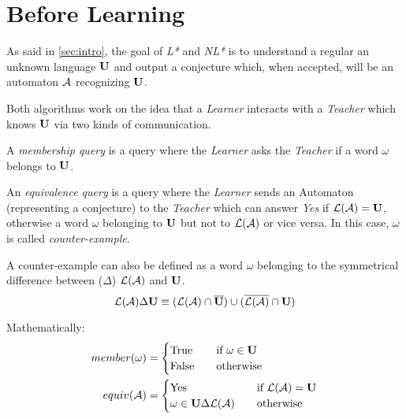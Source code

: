 \section{Before Learning}
As said in \cref{sec:intro}, the goal of \textit{L*} and \textit{NL*} is to understand a regular an unknown language $\mathbf{U}$ and output a conjecture which, when accepted, will be an automaton $\mathcal{A}$ recognizing $\mathbf{U}$.

Both algorithms work on the idea that a \textit{Learner} interacts with a \textit{Teacher} which knows $\mathbf{U}$ via two kinds of communication.

\begin{definition}
  A \textit{membership query} is a query where the \textit{Learner} asks the \textit{Teacher} if a word $\omega$ belongs to $\mathbf{U}$.
\end{definition}

\begin{definition}
  An \textit{equivalence query} is a query where the \textit{Learner} sends an Automaton (representing a conjecture) to the \textit{Teacher} which can answer \textit{Yes} if $\mathcal{L}(\mathcal{A}) = \mathbf{U}$, otherwise a word $\omega$ belonging to $\mathbf{U}$ but not to $\mathcal{L}(\mathcal{A})$ or vice versa. In this case, $\omega$ is called \textit{counter-example}.
\end{definition}

A counter-example can also be defined as a word $\omega$ belonging to the symmetrical difference between ($\Delta$) $\mathcal{L}(\mathcal{A})$ and $\mathbf{U}$.
\[\mathcal{L}(\mathcal{A}) \Delta \mathbf{U} \equiv (\mathcal{L}(\mathcal{A}) \cap \overline{\mathbf{U}}) \cup (\overline{\mathcal{L}(\mathcal{A})} \cap \mathbf{U})\]

Mathematically:
\begin{equation}
  \begin{aligned}
    \label{eq:interactions}
    member(\omega) & =
    \begin{cases}
      \text{True}  & \quad  \text{if } \omega \in \mathbf{U} \\
      \text{False} & \quad   \text{otherwise}
    \end{cases}
    \\
    equiv(\mathcal{A})      & =
    \begin{cases}
      \text{Yes}               & \quad \text{if } \mathcal{L}(\mathcal{A}) = \mathbf{U} \\
      \omega \in \mathbf{U} \Delta \mathcal{L}(\mathcal{A}) & \quad \text{otherwise}
    \end{cases}
  \end{aligned}
\end{equation}
